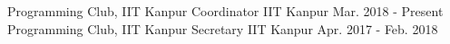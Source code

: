 

\begin{cventries}

  \extraentry
  {Programming Club, IIT Kanpur}
  {Coordinator}
  {IIT Kanpur}
  {Mar. 2018 - Present}
  {
  }
  \vspace{-0.3cm}
  \extraentry
  {Programming Club, IIT Kanpur}
  {Secretary}
  {IIT Kanpur}
  {Apr. 2017 - Feb. 2018}
  {
  }
  \vspace{-0.3cm}

\end{cventries}
